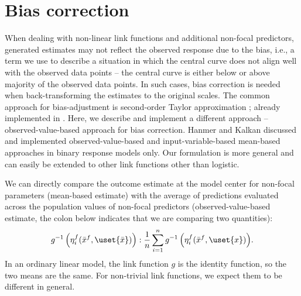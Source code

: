 
\section{Bias correction}

When dealing with non-linear link functions and additional non-focal predictors,  generated estimates may not reflect the observed response due to the bias, i.e., a term we use to describe a situation in which the central curve does not align well with the observed data points -- the central curve is either below or above majority of the observed data points. In such cases, bias correction is needed when back-transforming the estimates to the original scales. The common approach for bias-adjustment is second-order Taylor approximation \citep{duursma2003bias, hanmer2013behind}; already implemented in  \citep{lenth2018package}. Here, we describe and implement a different approach -- observed-value-based approach for bias correction. Hanmer and Kalkan \citep{hanmer2013behind} discussed and implemented observed-value-based and input-variable-based mean-based approaches in binary response models only. Our formulation is more general and can easily be extended to other link functions other than logistic. 


We can directly compare the outcome estimate at the model center for non-focal parameters (mean-based estimate) with the average of predictions evaluated across the population values of non-focal predictors (observed-value-based estimate, the colon below indicates that we are comparing two quantities):
%
\begin{align}\label{eq:compare_anchored_pop_based}
g^{-1} \left(\eta_i^f(\bar{x}^f, \uset{\bar{x}})\right) : \frac{1}{n} \sum_{i=1}^n{ g^{-1} \left(\eta_i^f(\bar{x}^f, \uset{x})\right)}.
\end{align}
%
In an ordinary linear model, the link function $g$ is the identity function, so the two means are the same. For non-trivial link functions, we expect them to be different in general.

